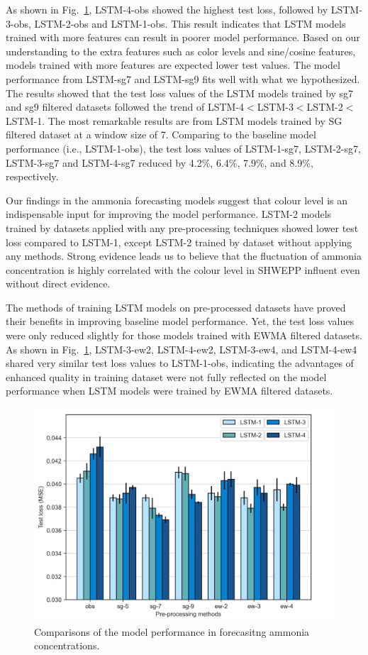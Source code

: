 As shown in Fig.~\ref{fig:nh3-feature-engineering}, LSTM-4-obs showed the highest test loss, followed by LSTM-3-obs, LSTM-2-obs and LSTM-1-obs. This result indicates that LSTM models trained with more features can result in poorer model performance. Based on our understanding to the extra features such as color levels and sine/cosine features, models trained with more features are expected lower test values. The model performance from LSTM-sg7 and LSTM-sg9 fits well with what we hypothesized. The results showed that the test loss values of the LSTM models trained by sg7 and sg9 filtered datasets followed the trend of LSTM-4$<$LSTM-3$<$LSTM-2$<$LSTM-1. The most remarkable results are from LSTM models trained by SG filtered dataset at a window size of 7. Comparing to the baseline model performance (i.e., LSTM-1-obs), the test loss values of LSTM-1-sg7, LSTM-2-sg7, LSTM-3-sg7 and LSTM-4-sg7 reduced by 4.2\%, 6.4\%, 7.9\%, and 8.9\%, respectively. 

Our findings in the ammonia forecasting models suggest that colour level is an indispensable input for improving the model performance. LSTM-2 models trained by datasets applied with any pre-processing techniques showed lower test loss compared to LSTM-1, except LSTM-2 trained by dataset without applying any methods. Strong evidence leads us to believe that the fluctuation of ammonia concentration is highly correlated with the colour level in SHWEPP influent even without direct evidence.

The methods of training LSTM models on pre-processed datasets have proved their benefits in improving baseline model performance. Yet, the test loss values were only reduced slightly for those models trained with EWMA filtered datasets. As shown in Fig.~\ref{fig:nh3-feature-engineering}, LSTM-3-ew2, LSTM-4-ew2, LSTM-3-ew4, and LSTM-4-ew4 shared very similar test loss values to LSTM-1-obs, indicating the advantages of enhanced quality in training dataset were not fully reflected on the model performance when LSTM models were trained by EWMA filtered datasets.

\begin{figure}[h]
    \centering
    \includegraphics[width=0.6\columnwidth]{imgs/results/feature-engineering/nh3-input-1-4-comparison.png}
    \caption{Comparisons of the model performance in forecasitng ammonia concentrations.}
    \label{fig:nh3-feature-engineering}
 \end{figure}

